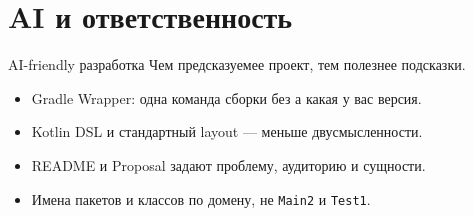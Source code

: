 \section{AI и ответственность}

\begin{frame}{AI-friendly разработка}
  Чем предсказуемее проект, тем полезнее подсказки.

  \medskip
  \begin{itemize}\setlength\itemsep{0.4em}
    \item Gradle Wrapper: одна команда сборки без \flqq а какая у вас версия\frqq.
    \item Kotlin DSL и стандартный layout --- меньше двусмысленности.
    \item README и Proposal задают проблему, аудиторию и сущности.
    \item Имена пакетов и классов по домену, не \texttt{Main2} и \texttt{Test1}.
  \end{itemize}
\end{frame}
